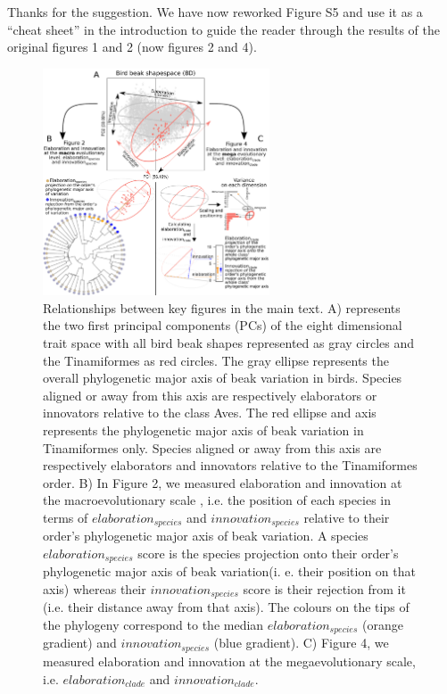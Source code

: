 \documentclass[12pt,letterpaper]{article}
\begin{document}
Thanks for the suggestion. We have now reworked Figure S5 and use it as a “cheat sheet” in the introduction to guide the reader through the results of the original figures 1 and 2 (now figures 2 and 4).

\begin{figure}[!htbp]
\centering
   \includegraphics[width=0.6\textwidth]{Figures/cheat_sheet.pdf}
\caption{\scriptsize{Relationships between key figures in the main text.
A) represents the two first principal components (PCs) of the eight dimensional trait space with all bird beak shapes represented as gray circles and the Tinamiformes as red circles.
The gray ellipse represents the overall phylogenetic major axis of beak variation in birds.
Species aligned or away from this axis are respectively elaborators or innovators relative to the class Aves.
The red ellipse and axis represents the phylogenetic major axis of beak variation in Tinamiformes only.
Species aligned or away from this axis are respectively elaborators and innovators relative to the Tinamiformes order.
B) In Figure 2, we measured elaboration and innovation at the macroevolutionary scale , i.e. the position of each species in terms of $elaboration_{species}$ and $innovation_{species}$ relative to their order's phylogenetic major axis of beak variation.
A species $elaboration_{species}$ score is the species projection onto their order's phylogenetic major axis of beak variation(i. e. their position on that axis) whereas their $innovation_{species}$ score is their rejection from it (i.e. their distance away from that axis).
The colours on the tips of the phylogeny correspond to the median $elaboration_{species}$ (orange gradient) and $innovation_{species}$ (blue gradient).
C) Figure 4, we measured elaboration and innovation at the megaevolutionary scale, i.e. $elaboration_{clade}$ and $innovation_{clade}$.
}}
\end{figure}
\end{document}

